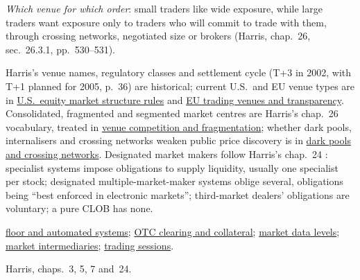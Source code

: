 \begin{qfdefinition}
\emph{Which venue for which order}: small traders like wide exposure, while large traders want exposure only to traders who will commit to trade with them, through crossing networks, negotiated size or brokers (Harris, chap.~26, sec.~26.3.1, pp.~530--531).

 Harris's venue names, regulatory classes and settlement cycle (T+3 in 2002, with T+1 planned for 2005, p.~36) are historical; current U.S.\ and EU venue types are in \hyperref[rule:us-equity-market-structure]{U.S.\ equity market structure rules} and \hyperref[rule:eu-trading-venue-transparency]{EU trading venues and transparency}. Consolidated, fragmented and segmented market centres are Harris's chap.~26 vocabulary, treated in \hyperref[mech:venue-competition-fragmentation]{venue competition and fragmentation}; whether dark pools, internalisers and crossing networks weaken public price discovery is in \hyperref[def:dark-pools-crossing]{dark pools and crossing networks}. Designated market makers follow Harris's chap.~24 \citep[sec.~24.1, pp.~495--496]{alpha-harris}: specialist systems impose obligations to supply liquidity, usually one specialist per stock; designated multiple-market-maker systems oblige several, obligations being ``best enforced in electronic markets''; third-market dealers' obligations are voluntary; a pure CLOB has none.

 \hyperref[def:floor-automated-trading-systems]{floor and automated systems}; \hyperref[mech:otc-clearing-collateral]{OTC clearing and collateral}; \hyperref[data:market-data-levels]{market data levels}; \hyperref[def:market-intermediaries]{market intermediaries}; \hyperref[def:trading-sessions-execution-systems]{trading sessions}.

 Harris, chaps.~3, 5, 7 and~24.

\end{qfdefinition}

